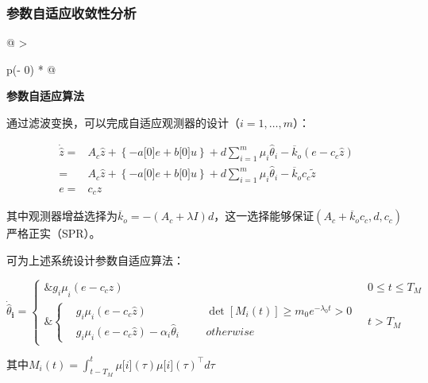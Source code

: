 \documentclass[
  12pt,
  a4paper
]{article}
\begin{document}
\subsubsection{参数自适应收敛性分析}\label{ux53c2ux6570ux81eaux9002ux5e94ux6536ux655bux6027ux5206ux6790}

\begin{longtable}[]{@{}
  >{\raggedright\arraybackslash}p{}@{}}
\toprule\noalign{}
\begin{minipage}[b]{\linewidth}\raggedright
\textbf{参数自适应算法}

通过滤波变换，可以完成自适应观测器的设计（\(i = 1,\ldots,m\)）：

\[\begin{aligned}
\dot{\widehat{z}} = & A_{c}\widehat{z} + \left\{ - a\lbrack 0\rbrack e + b\lbrack 0\rbrack u \right\} + d\sum_{i = 1}^{m}{\mu_{i}{\widehat{\theta}}_{i}} - {\overline{k}}_{o}(e - c_{c}\widehat{z}) \\
 = & A_{c}\widehat{z} + \left\{ - a\lbrack 0\rbrack e + b\lbrack 0\rbrack u \right\} + d\sum_{i = 1}^{m}{\mu_{i}{\widehat{\theta}}_{i}} - {\overline{k}}_{o}c_{c}\widetilde{z} \\
e = & c_{c}z
\end{aligned}\]

其中观测器增益选择为\({\overline{k}}_{o} = - \left( A_{c} + \lambda I \right)d\)，这一选择能够保证\((A_{c} + {\overline{k}}_{o}c_{c},d,c_{c})\)严格正实（SPR）。

可为上述系统设计参数自适应算法：

\[{\dot{\widehat{\theta}}}_{\mathbf{i}}\mathbf{=}\left\{ \begin{aligned}
\mathbf{\&}{g_{i}\mu}_{i}\left( e - c_{c}\widehat{z} \right) & 0 \leq t \leq T_{M} \\
\mathbf{\&}\left\{ \begin{array}{rlrlr}
 & g_{i}\mu_{i}\left( e - c_{c}\widehat{z} \right) & & & \det\left\lbrack M_{i}(t) \right\rbrack \geq m_{0}e^{- \lambda_{0}t} > 0 \\
 & g_{i}\mu_{i}\left( e - c_{c}\widehat{z} \right) - \alpha_{i}{\widehat{\theta}}_{i} & & & otherwise
\end{array} \right.\  & t > T_{M}
\end{aligned} \right.\ \]

其中\(M_{i}(t) = \int_{t - T_{M}}^{t}{\mu\lbrack i\rbrack(\tau)\mu\lbrack i\rbrack(\tau)^{\top}}d\tau\)
\end{minipage} \\
\midrule\noalign{}
\endhead
\bottomrule\noalign{}
\endlastfoot
\end{longtable}
\end{document}
